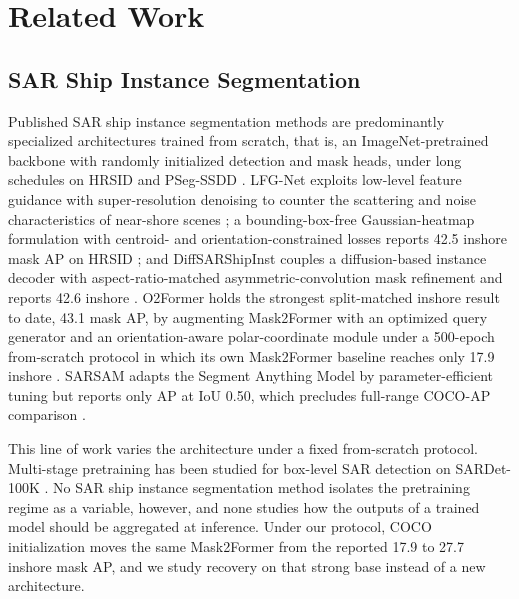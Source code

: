 \section{Related Work}
\label{sec:related}

\subsection{SAR Ship Instance Segmentation}
\label{sec:related-sar}
Published SAR ship instance segmentation methods are predominantly specialized architectures trained from scratch, that is, an ImageNet-pretrained backbone with randomly initialized detection and mask heads, under long schedules on HRSID \cite{hrsid2020} and PSeg-SSDD \cite{ssdd2021}. LFG-Net exploits low-level feature guidance with super-resolution denoising to counter the scattering and noise characteristics of near-shore scenes \cite{lfgnet2022}; a bounding-box-free Gaussian-heatmap formulation with centroid- and orientation-constrained losses reports 42.5 inshore mask AP on HRSID \cite{gaussheatmap2024}; and DiffSARShipInst couples a diffusion-based instance decoder with aspect-ratio-matched asymmetric-convolution mask refinement and reports 42.6 inshore \cite{diffsar2025}. O2Former holds the strongest split-matched inshore result to date, 43.1 mask AP, by augmenting Mask2Former \cite{mask2former2022} with an optimized query generator and an orientation-aware polar-coordinate module under a 500-epoch from-scratch protocol in which its own Mask2Former baseline reaches only 17.9 inshore \cite{o2former2025}. SARSAM adapts the Segment Anything Model by parameter-efficient tuning but reports only AP at IoU 0.50, which precludes full-range COCO-AP comparison \cite{sarsam2025}.

This line of work varies the architecture under a fixed from-scratch protocol. Multi-stage pretraining has been studied for box-level SAR detection on SARDet-100K \cite{sardet100k2024}. No SAR ship instance segmentation method isolates the pretraining regime as a variable, however, and none studies how the outputs of a trained model should be aggregated at inference. Under our protocol, COCO initialization moves the same Mask2Former from the reported 17.9 to 27.7 inshore mask AP, and we study recovery on that strong base instead of a new architecture.

